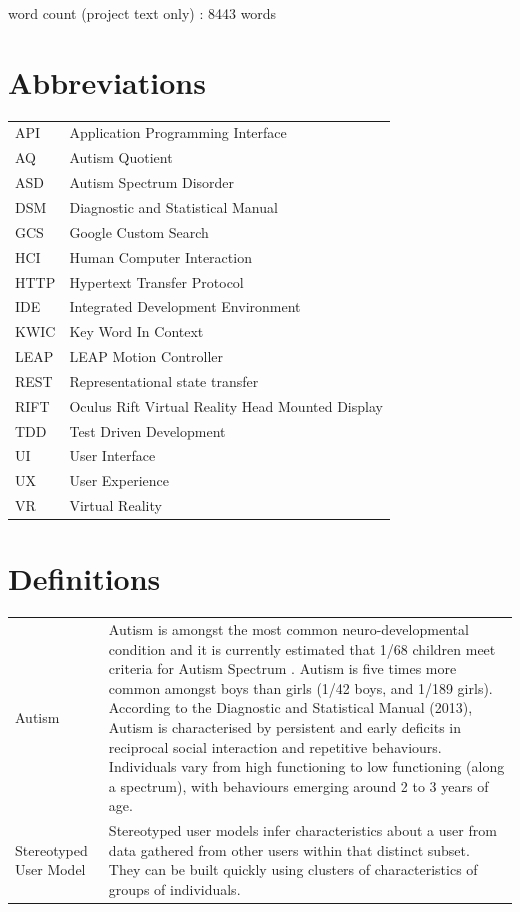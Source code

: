 \documentclass[a4paper, 11pt]{article}
\begin{document}
\begin{center}
word count (project text only) : 8443 words
\end{center}

\clearpage
\tableofcontents
\clearpage

\section*{Abbreviations}
\begin{tabular}{l l }
API & Application Programming Interface\\
AQ & Autism Quotient\\
ASD & Autism Spectrum Disorder\\
DSM & Diagnostic and Statistical Manual\\
GCS & Google Custom Search\\
HCI & Human Computer Interaction\\
HTTP & Hypertext Transfer Protocol\\
IDE & Integrated Development Environment\\
KWIC & Key Word In Context\\
LEAP & LEAP Motion Controller\\
REST & Representational state transfer\\
RIFT & Oculus Rift Virtual Reality Head Mounted Display\\
TDD & Test Driven Development\\
UI & User Interface\\
UX & User Experience\\
VR & Virtual Reality\\
\end{tabular}

\section*{Definitions}

\begin{tabular}{l p{11cm}  }
Autism & Autism is amongst the most common neuro-developmental condition and it is currently estimated that 1/68 children meet criteria for Autism Spectrum \cite{CDC}. Autism is five times more common amongst boys than girls (1/42 boys, and 1/189 girls). According to the Diagnostic and Statistical Manual (2013), Autism is characterised by persistent and early deficits in reciprocal social interaction and repetitive behaviours. Individuals vary from high functioning to low functioning (along a spectrum), with behaviours emerging around 2 to 3 years of age.\\


Stereotyped User Model & Stereotyped user models infer characteristics about a user from data gathered from other users within that distinct subset. They can be built quickly using clusters of characteristics of groups of individuals. 

\end{tabular}
\clearpage
\end{document}
